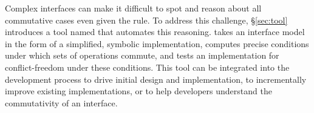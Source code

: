 \begin{comment}
Applying the rule to real-world software systems poses two challenges.
%
First, the usual definition of commutativity is limited in ways that
restricts its applicability to complex, stateful interfaces.  To
address this challenge, \S\ref{sec:rule} defines a novel form of
commutativity named \emph{\SRI\ commutativity}.
%
\SRI commutativity is \emph{state-dependent}: rather than requiring
operations to be order-invariant in all states, \SRI\ commutativity
allows developers to reason not only about specific arguments for
which operations commute, but also in which system states they
commute, exposing more opportunities to apply the rule.  The above
example from POSIX shows why this is important: creating files with
different names does \emph{not} commute if the names are symlinks to
the same name, but this one case does not limit the rule's
applicability to other file system states.
%
\SRI\ commutativity is \emph{region-oriented}: rather than applying to just
two operations, \SRI\ commutativity applies to a region of an execution
trace, which may contain several operations, again exposing more
opportunities to apply the rule.
%
Finally, it is \emph{interface-based}: rather than requiring all
operation orders to produce identical internal states, it requires the
resulting states to be indistinguishable via the interface, allowing
developers to reason about commutativity independent of any specific
implementation.

\XXX[AC][Spread the above new terminology to the rest of the paper.]
\end{comment}

Complex interfaces can make it difficult to spot and reason about all
commutative cases even given the rule.  To address this challenge,
\S\ref{sec:tool} introduces a tool named \tool that automates this
reasoning.  \tool takes an interface model
in the form of a simplified, symbolic implementation, computes precise
conditions under which sets of operations commute, and tests an
implementation for conflict-freedom under these conditions.  This tool can be
integrated into the development process to drive initial design and
implementation, to incrementally improve existing implementations, or to
help developers understand the commutativity of an interface.
%

